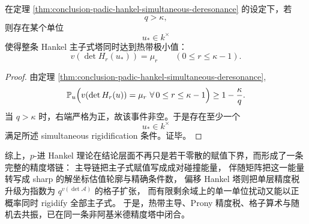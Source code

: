 \begin{corollary}\label{cor:conclusion-padic-hankel-global-rigidifier}
在定理 \ref{thm:conclusion-padic-hankel-simultaneous-deresonance} 的设定下，若
\[
q>\kappa,
\]
则存在某个单位
\[
u_\ast\in k^\times
\]
使得整条 Hankel 主子式塔同时达到热带极小值：
\[
v(\det H_r(u_\ast))=\mu_r
\qquad(0\le r\le \kappa-1).
\]
\end{corollary}
\begin{proof}
由定理 \ref{thm:conclusion-padic-hankel-simultaneous-deresonance},
\[
\mathbb P_u\Bigl(v(\det H_r(u))=\mu_r\ \forall\,0\le r\le \kappa-1\Bigr)\ge 1-\frac{\kappa}{q}.
\]
当 \(q>\kappa\) 时，右端严格为正，故该事件非空。于是存在至少一个
\[
u_\ast\in k^\times
\]
满足所述 simultaneous rigidification 条件。证毕。
\end{proof}

综上，\(p\)-进 Hankel 理论在结论层面不再只是若干零散的赋值下界，而形成了一条完整的精度塔链：
主导链把主子式赋值写成成对碰撞能量，
伴随矩阵把这一能量转写成 sharp 的解坐标估值轮廓与精确条件数，
偏移 Hankel 塔则把单层精度税升级为指数为 \(q^{v(\det\mathcal A)}\) 的格子扩张，
而有限剩余域上的单一单位扰动又能以正概率同时 rigidify 全部主子式。
于是，热带主导、Prony 精度税、格子算术与随机去共振，已在同一条非阿基米德精度塔中闭合。

\endinput
